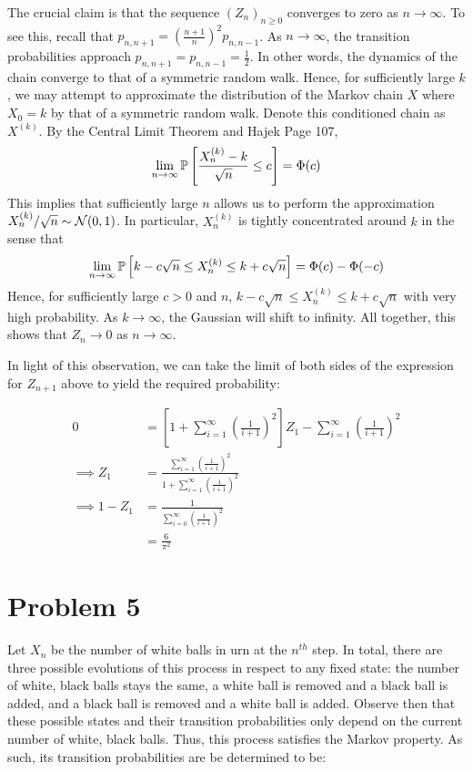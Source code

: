 \documentclass[12pt]{article}%
\begin{document}
The crucial claim is that the sequence $(Z_{n})_{n \geq 0}$ converges to zero as $n \rightarrow \infty$. To see this, recall that $p_{n,n+1} = \left(\frac{n+1}{n}\right)^{2}p_{n,n-1}$. As $n \rightarrow \infty$, the transition probabilities approach $p_{n,n+1} = p_{n,n-1} = \frac{1}{2}$. In other words, the dynamics of the chain converge to that of a symmetric random walk. Hence, for sufficiently large $k$, we may attempt to approximate the distribution of the Markov chain $X$ where $X_{0} = k$ by that of a symmetric random walk. Denote this conditioned chain as $X^{(k)}$. By the Central Limit Theorem and Hajek Page 107, \[\lim_{n \rightarrow \infty}\mathbb{P}\left[\frac{X_{n}^{(k)} - k}{\sqrt{n}} \leq c\right] = \Phi(c) \] This implies that sufficiently large $n$ allows us to perform the approximation $X^{(k)}_{n}/\sqrt{n} \sim \mathcal{N}(0,1)$. In particular, $X^{(k)}_{n}$ is tightly concentrated around $k$ in the sense that \[ \lim_{n \rightarrow \infty} \mathbb{P}\left[k-c\sqrt{n} \leq X^{(k)}_{n} \leq k+c\sqrt{n}\right] = \Phi(c) - \Phi(-c)\]
%
Hence, for sufficiently large $c > 0$ and $n$, $k-c\sqrt{n} \leq X_{n}^{(k)} \leq k+c\sqrt{n}$ with very high probability. As $k \rightarrow \infty$, the Gaussian will shift to infinity. All together, this shows that $Z_{n} \rightarrow 0$ as $n \rightarrow \infty$.

In light of this observation, we can take the limit of both sides of the expression for $Z_{n+1}$ above to yield the required probability:

\begin{align*}
  0 & = \left[1 +  \sum_{i = 1}^\infty \left(\frac{1}{i+1}\right)^{2}\right]Z_{1} -  \sum_{i = 1}^\infty \left(\frac{1}{i+1}\right)^{2} \\
  \implies Z_{1} & = \frac{\sum_{i=1}^{\infty}\left(\frac{1}{i+1}\right)^{2}}{1 + \sum_{i=1}^{\infty}\left(\frac{1}{i+1}\right)^{2}} \\
  \implies 1 - Z_{1} & = \frac{1}{\sum_{i=0}^{\infty}\left(\frac{1}{i+1}\right)^{2}} \\
 & = \boxed{\frac{6}{\pi^{2}}}
\end{align*}

\section{Problem 5}
\label{sec:problem-5}

Let $X_{n}$ be the number of white balls in urn at the $n^{{th}}$ step. In total, there are three possible evolutions of this process in respect to any fixed state: the number of white, black balls stays the same, a white ball is removed and a black ball is added, and a black ball is removed and a white ball is added. Observe then that these possible states and their transition probabilities only depend on the current number of white, black balls. Thus, this process satisfies the Markov property. As such, its transition probabilities are be determined to be:
\end{document}
